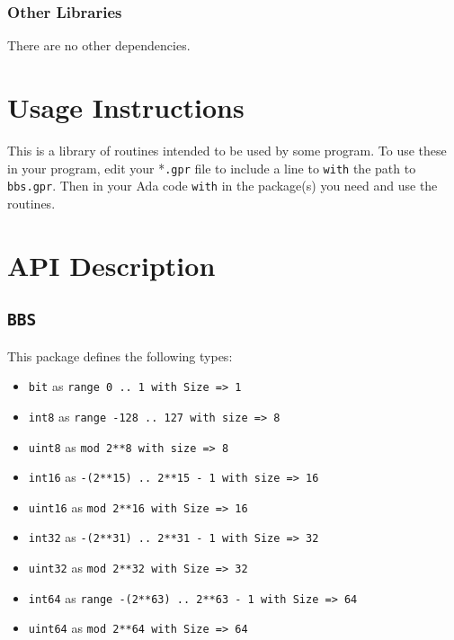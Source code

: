 \documentclass[10pt, openany]{book}
\newcommand{\package}[1]{\texttt{#1}}
\newcommand{\keyword}[1]{\texttt{#1}}
\newcommand{\datatype}[1]{\texttt{#1}}
\begin{document}
\subsection{Other Libraries}
There are no other dependencies.

\chapter{Usage Instructions}
This is a library of routines intended to be used by some program.  To use these in your program, edit your *\keyword{.gpr} file to include a line to \keyword{with} the path to \keyword{bbs.gpr}.  Then in your Ada code \keyword{with} in the package(s) you need and use the routines.

\chapter{API Description}
\section{\package{BBS}}
This package defines the following types:
\begin{itemize}
  \item \datatype{bit} as \datatype{range 0 .. 1 with Size => 1}
  \item \datatype{int8} as \datatype{range -128 .. 127 with size => 8}
  \item \datatype{uint8} as \datatype{mod 2**8  with size => 8}
  \item \datatype{int16} as \datatype{-(2**15) .. 2**15 - 1 with size => 16}
  \item \datatype{uint16} as \datatype{mod 2**16 with Size => 16}
  \item \datatype{int32} as \datatype{-(2**31) .. 2**31 - 1 with Size => 32}
  \item \datatype{uint32} as \datatype{mod 2**32  with Size => 32}
  \item \datatype{int64} as \datatype{range -(2**63) .. 2**63 - 1  with Size => 64}
  \item \datatype{uint64} as \datatype{mod 2**64 with Size => 64}
\end{itemize}
\end{document}
